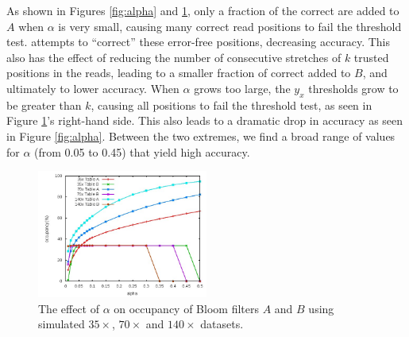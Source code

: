 \documentclass[10pt]{article}
\begin{document}
As shown in Figures \ref{fig:alpha} and \ref{fig:bloom_occupancy_alpha}, only a fraction of the correct \kmers are added to $A$ when $\alpha$ is very small, causing many correct read positions to fail the threshold test.  \tool attempts to ``correct'' these error-free positions, decreasing accuracy.  This also has the effect of reducing the number of consecutive stretches of $k$ trusted positions in the reads, leading to a smaller fraction of correct \kmers added to $B$, and ultimately to lower accuracy.  When $\alpha$ grows too large, the $y_x$ thresholds grow to be greater than $k$, causing all positions to fail the threshold test, as seen in Figure \ref{fig:bloom_occupancy_alpha}'s right-hand side.  This also leads to a dramatic drop in accuracy as seen in Figure \ref{fig:alpha}.  Between the two extremes, we find a broad range of values for $\alpha$ (from 0.05 to 0.45) that yield high accuracy.





\begin{figure}[h!]
\begin{center}
\includegraphics[width=0.5\textwidth]{bloom_occupancy_alpha.jpg}
\caption{The effect of $\alpha$ on occupancy of Bloom filters $A$ and $B$ using simulated $35\times$, $70\times$ and $140\times$ datasets.\label{fig:bloom_occupancy_alpha}}
\end{center}
\end{figure}
\end{document}
